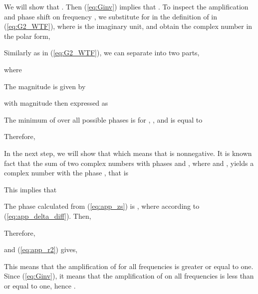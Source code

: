 \documentclass[final,5p,times,twocolumn]{elsarticle}
\begin{document}
We will show that . Then (\ref{eq:Ginv}) implies that . To inspect the amplification and phase shift on frequency , we substitute  for  in the definition of  in (\ref{eq:G2_WTF}), where  is the imaginary unit, and obtain the complex number  in the polar form,

Similarly as in (\ref{eq:G2_WTF}), we can separate  into two parts,

where

The magnitude  is given by

with magnitude  then expressed as

The minimum of  over all possible phases is for , , and is equal to

Therefore,


In the next step, we will show that  which means that  is nonnegative. It is known fact that the sum of two complex numbers with phases  and , where  and  , yields a complex number with the phase , that is

This implies that


The phase  calculated from (\ref{eq:app_zs}) is , where  according to (\ref{eq:app_delta_diff}). Then,

Therefore,

and (\ref{eq:app_r2}) gives,

This means that the amplification of  for all frequencies is greater or equal to one. Since  (\ref{eq:Ginv}), it means that the amplification of  on all frequencies is less than or equal to one, hence .





\end{document}
